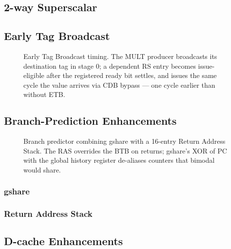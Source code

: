 \documentclass[conference]{IEEEtran}
\begin{document}
\subsection{2-way Superscalar}

\subsection{Early Tag Broadcast}

\begin{figure}[t]
    \centering
    
    \caption{Early Tag Broadcast timing. The MULT producer broadcasts its destination tag in stage 0; a dependent RS entry becomes issue-eligible after the registered ready bit settles, and issues the same cycle the value arrives via CDB bypass --- one cycle earlier than without ETB.}
    \label{fig:timing}
\end{figure}

\subsection{Branch-Prediction Enhancements}

\begin{figure}[t]
    \centering
    
    \caption{Branch predictor combining gshare with a 16-entry Return Address Stack. The RAS overrides the BTB on returns; gshare's XOR of PC with the global history register de-aliases counters that bimodal would share.}
    \label{fig:predictor}
\end{figure}

\subsubsection{gshare}

\subsubsection{Return Address Stack}

\subsection{D-cache Enhancements}
\end{document}
